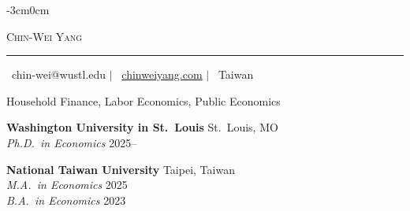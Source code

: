 \documentclass[a4paper, 11pt]{article}
\begin{document}
\reversemarginpar %


\begin{adjustwidth}{-3cm}{0cm} %

\begin{center}  %
  \item {\Calluna \fontsize{22pt}{22pt}\selectfont \textsc{Chin-Wei Yang}}
  \noindent\rule{}{0.4pt}
    \item \faEnvelope[regular] \ {\Adobe chin-wei@wustl.edu} 
    $|$ 
    \faHome \ {\Adobe \href{www.chinweiyang.com}{chinweiyang.com}} 
    $|$ 
    \faPassport \ {\Adobe Taiwan}
\end{center}
\end{adjustwidth}



Household Finance, Labor Economics, Public Economics

\vspace{0.3em}



\textbf{Washington University in St.\ Louis} \hfill St.\ Louis, MO\\
\textit{Ph.D.\ in Economics} \hfill 2025--\\
\vspace{0.2em}

\textbf{National Taiwan University} \hfill Taipei, Taiwan\\
\textit{M.A.\ in Economics} 
\hfill 2025\\
\textit{B.A.\ in Economics} \hfill 2023\\



\end{document}
